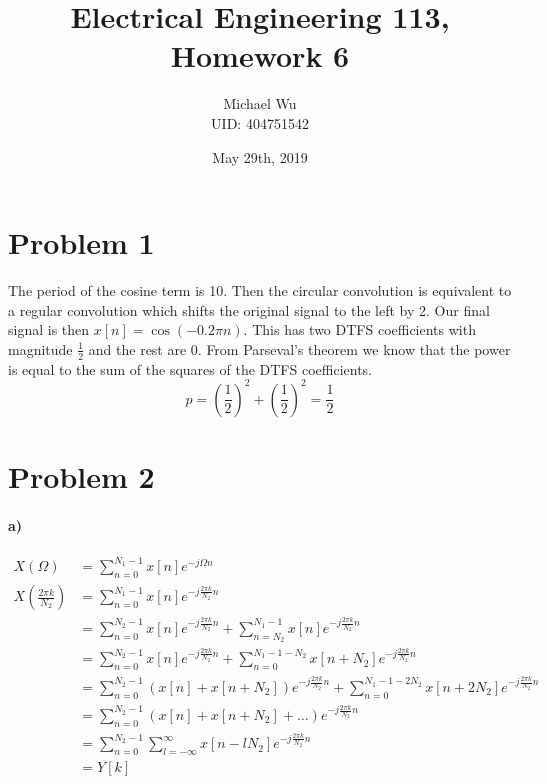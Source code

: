 \documentclass[12pt]{article}
\begin{document}
\title{Electrical Engineering 113, Homework 6}
\date{May 29th, 2019}
\author{Michael Wu\\UID: 404751542}
\maketitle

\section*{Problem 1}

The period of the cosine term is 10. Then the circular convolution is equivalent to a regular convolution which shifts the original
signal to the left by 2. Our final signal is then \(x[n]=\cos(-0.2\pi n)\). This has two DTFS coefficients with magnitude \(\frac{1}{2}\)
and the rest are 0. From Parseval's theorem we know that the power is equal to the sum of the squares of the DTFS coefficients.
\[p = \left(\frac{1}{2}\right)^2 + \left(\frac{1}{2}\right)^2 = \frac{1}{2}\]

\section*{Problem 2}

\paragraph{a)}

\begin{align*}
    X(\Omega) &= \sum_{n=0}^{N_1-1} x[n] e^{-j\Omega n}\\
    X\left(\frac{2\pi k}{N_2}\right) &= \sum_{n=0}^{N_1-1} x[n] e^{-j\frac{2\pi k}{N_2} n}\\
    &= \sum_{n=0}^{N_2-1} x[n] e^{-j\frac{2\pi k}{N_2} n} + \sum_{n=N_2}^{N_1-1} x[n] e^{-j\frac{2\pi k}{N_2} n}\\
    &= \sum_{n=0}^{N_2-1} x[n] e^{-j\frac{2\pi k}{N_2} n} + \sum_{n=0}^{N_1-1-N_2} x[n+N_2] e^{-j\frac{2\pi k}{N_2} n}\\
    &= \sum_{n=0}^{N_2-1} (x[n] + x[n+N_2] )e^{-j\frac{2\pi k}{N_2} n} + \sum_{n=0}^{N_1-1-2N_2} x[n+2N_2] e^{-j\frac{2\pi k}{N_2} n}\\
    &= \sum_{n=0}^{N_2-1} (x[n] + x[n+N_2] + \ldots)e^{-j\frac{2\pi k}{N_2} n}\\
    &= \sum_{n=0}^{N_2-1} \sum_{l=-\infty}^\infty x[n-lN_2] e^{-j\frac{2\pi k}{N_2} n}\\
    &= Y[k]
\end{align*}
\end{document}

